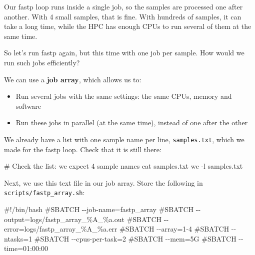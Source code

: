 \documentclass[
  letterpaper,
  DIV=11,
  numbers=noendperiod]{scrreprt}
\newenvironment{Shaded}{}{}
\newcommand{\AttributeTok}[1]{\textcolor[rgb]{0.84,0.23,0.29}{#1}}
\newcommand{\CommentTok}[1]{\textcolor[rgb]{0.42,0.45,0.49}{#1}}
\newcommand{\FunctionTok}[1]{\textcolor[rgb]{0.44,0.26,0.76}{#1}}
\newcommand{\NormalTok}[1]{\textcolor[rgb]{0.14,0.16,0.18}{#1}}
\providecommand{\tightlist}{%
  \setlength{\itemsep}{0pt}\setlength{\parskip}{0pt}}
\begin{document}
\begin{tcolorbox}[enhanced jigsaw, colbacktitle=quarto-callout-tip-color!10!white, rightrule=.15mm, leftrule=.75mm, colback=white, opacitybacktitle=0.6, title=\textcolor{quarto-callout-tip-color}{\faLightbulb}\hspace{0.5em}{Tip: Running many samples in parallel with job arrays (optional)}, bottomrule=.15mm, left=2mm, colframe=quarto-callout-tip-color-frame, opacityback=0, breakable, bottomtitle=1mm, coltitle=black, arc=.35mm, toprule=.15mm, toptitle=1mm, titlerule=0mm]

Our fastp loop runs inside a single job, so the samples are processed
one after another. With 4 small samples, that is fine. With hundreds of
samples, it can take a long time, while the HPC has enough CPUs to run
several of them at the same time.

So let's run fastp again, but this time with one job per sample. How
would we run such jobs efficiently?

We can use a \textbf{job array}, which allows us to:

\begin{itemize}
\tightlist
\item
  Run several jobs with the same settings: the same CPUs, memory and
  software
\item
  Run these jobs in parallel (at the same time), instead of one after
  the other
\end{itemize}

We already have a list with one sample name per line,
\texttt{samples.txt}, which we made for the fastp loop. Check that it is
still there:

\begin{Shaded}
\begin{Highlighting}[]
\CommentTok{\# Check the list: we expect 4 sample names}
\FunctionTok{cat}\NormalTok{ samples.txt}
\FunctionTok{wc} \AttributeTok{{-}l}\NormalTok{ samples.txt}
\end{Highlighting}
\end{Shaded}

Next, we use this text file in our job array. Store the following in
\texttt{scripts/fastp\_array.sh}:

\begin{Shaded}
\begin{Highlighting}[]
\CommentTok{\#!/bin/bash}
\CommentTok{\#SBATCH {-}{-}job{-}name=fastp\_array}
\CommentTok{\#SBATCH {-}{-}output=logs/fastp\_array\_\%A\_\%a.out}
\CommentTok{\#SBATCH {-}{-}error=logs/fastp\_array\_\%A\_\%a.err}
\CommentTok{\#SBATCH {-}{-}array=1{-}4}
\CommentTok{\#SBATCH {-}{-}ntasks=1}
\CommentTok{\#SBATCH {-}{-}cpus{-}per{-}task=2}
\CommentTok{\#SBATCH {-}{-}mem=5G}
\CommentTok{\#SBATCH {-}{-}time=01:00:00}


\end{Highlighting}
\end{Shaded}
\end{tcolorbox}
\end{document}
